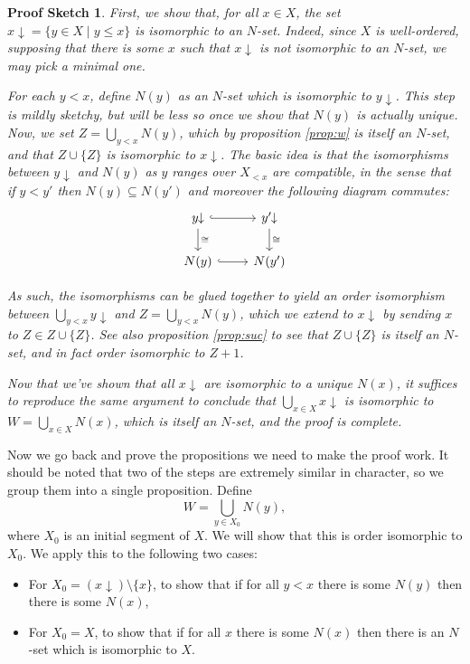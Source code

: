 \documentclass{article}
\theoremstyle{nonumberplain}
\newtheorem{proofsketch}{Proof Sketch}
\newcommand{\below}[1]{{#1\!\!\downarrow}}
\begin{document}
\begin{proofsketch}
First, we show that, for all $x \in X$, the set $\below x = \{y \in X \mid y\leq x\}$ is isomorphic to an $N$-set. Indeed, since $X$ is well-ordered, supposing that there is some $x$ such that $\below x$ is not isomorphic to an $N$-set, we may pick a minimal one.

For each $y < x$, define $N(y)$ as an $N$-set which is isomorphic to $\below y$. This step is mildly sketchy, but will be less so once we show that $N(y)$ is actually unique. Now, we set $Z =\bigcup_{y<x} N(y)$, which by proposition \ref{prop:w} is itself an $N$-set, and that $Z \cup \{Z\}$ is isomorphic to $\below x$. The basic idea is that the isomorphisms between $\below y$ and $N(y)$ as $y$ ranges over $X_{<x}$ are compatible, in the sense that if $y < y'$ then $N(y) \subseteq N(y')$ and moreover the following diagram commutes:
\begin{equation}
\begin{tikzcd}
\below y \arrow[d, "\cong" ] \arrow[r, hook] & \below{y'} \arrow[d, "\cong" ] \\
N(y) \arrow[r, hook]                                    & N(y')                                    
\end{tikzcd}
\end{equation}

As such, the isomorphisms can be glued together to yield an order isomorphism between $\bigcup_{y<x} \below y$ and $Z = \bigcup_{y<x} N(y)$, which we extend to $\below x$ by sending $x$ to $Z \in Z \cup \{Z\}$. See also proposition \ref{prop:suc} to see that $Z \cup \{Z\}$ is itself an $N$-set, and in fact order isomorphic to $Z+1$.

Now that we've shown that all $\below x$ are isomorphic to a unique $N(x)$, it suffices to reproduce the same argument to conclude that $\bigcup_{x \in X} \below x$ is isomorphic to $W = \bigcup_{x\in X} N(x)$, which is itself an $N$-set, and the proof is complete.
\end{proofsketch}

Now we go back and prove the propositions we need to make the proof work. It should be noted that two of the steps are extremely similar in character, so we group them into a single proposition. Define
\begin{equation}
W = \bigcup_{y \in X_0} N(y),
\end{equation}
where $X_0$ is an initial segment of $X$. We will show that this is order isomorphic to $X_0$. We apply this to the following two cases:
\begin{itemize}
\item For $X_0 = (\below x)\setminus \{x\}$, to show that if for all $y < x$ there is some $N(y)$ then there is some $N(x)$,
\item For $X_0 = X$, to show that if for all $x$ there is some $N(x)$ then there is an $N$-set which is isomorphic to $X$.
\end{itemize}
\end{document}
